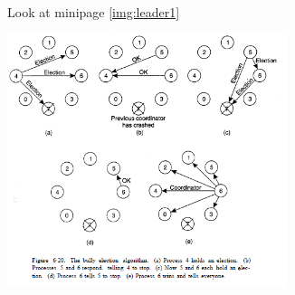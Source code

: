 Look at minipage \ref{img:leader1}
\begin{minipage}{\linewidth}
	\centering\includegraphics[width=310px]{gfx/leader1.png}
	\label{img:leader1}
\end{minipage}


